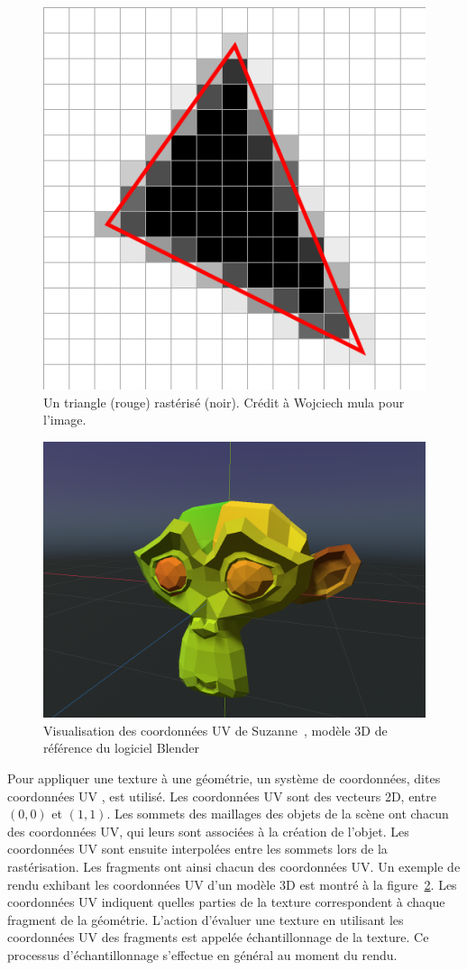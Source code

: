 \begin{figure}[h]
    \centering
    \includegraphics[width=.55\textwidth]{contenu/resources/images/rasterization}
    \caption[Rastérisation d'un triangle]{Un triangle (rouge) rastérisé (noir). Crédit à Wojciech mula pour l'image.}
    \label{fig:rasterization}
\end{figure}

\bigskip

\begin{figure}
    \centering
    \includegraphics[width=.55\textwidth]{contenu/resources/images/uv_suzanne}
    \caption[Coordonnées UV du modèle Suzanne]{Visualisation des coordonnées UV de Suzanne~\cite{overbruggen_suzanne_2002}, modèle 3D de référence du logiciel Blender}
    \label{fig:uv-suzanne}
\end{figure}

Pour appliquer une texture à une géométrie, un système de coordonnées, dites \og coordonnées UV \fg, est utilisé. Les coordonnées UV sont des vecteurs 2D, entre $(0, 0)$ et $(1, 1)$. Les sommets des maillages des objets de la scène ont chacun des coordonnées UV, qui leurs sont associées à la création de l'objet. Les coordonnées UV sont ensuite interpolées entre les sommets lors de la rastérisation. Les fragments ont ainsi chacun des coordonnées UV. Un exemple de rendu exhibant les coordonnées UV d'un modèle 3D est montré à la figure~\ref{fig:uv-suzanne}. Les coordonnées UV indiquent quelles parties de la texture correspondent à chaque fragment de la géométrie. L'action d'évaluer une texture en utilisant les coordonnées UV des fragments est appelée \og échantillonnage \fg de la texture. Ce processus d'échantillonnage s'effectue en général au moment du rendu.

